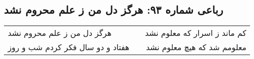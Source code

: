 \begin{center}
\section*{رباعی شماره ۹۳: هرگز دل من ز علم محروم نشد}
\label{sec:sh093}
\begin{longtable}{l p{0.5cm} r}
هرگز دل من ز علم محروم نشد
&&
کم ماند ز اسرار که معلوم نشد
\\
هفتاد و دو سال فکر کردم شب و روز
&&
معلومم شد که هیچ معلوم نشد
\\
\end{longtable}
\end{center}
